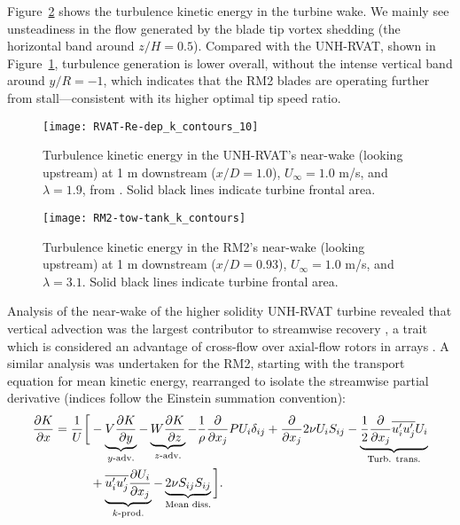 Figure~\ref{fig:kcont} shows the turbulence kinetic energy in the turbine wake. We
mainly see unsteadiness in the flow generated by the blade tip vortex shedding
(the horizontal band around $z/H=0.5$). Compared with the UNH-RVAT, shown in
Figure~\ref{fig:rvat-kcont}, turbulence generation is lower overall, without the
intense vertical band around $y/R=-1$, which indicates that the RM2 blades are
operating further from stall---consistent with its higher optimal tip speed
ratio.

\begin{figure}
    \texttt{[image: RVAT-Re-dep\_k\_contours\_10]}
    
    \caption{Turbulence kinetic energy in the UNH-RVAT's near-wake (looking
        upstream) at 1 m downstream ($x/D=1.0$), $U_\infty=1.0$ m/s, and
        $\lambda=1.9$, from \cite{Bachant2016-Energies}. Solid black lines indicate
        turbine frontal area.}
    
    \label{fig:rvat-kcont}
\end{figure}

\begin{figure}
    \texttt{[image: RM2-tow-tank\_k\_contours]}
    
    \caption{Turbulence kinetic energy in the RM2's near-wake (looking upstream)
        at 1 m downstream ($x/D=0.93$), $U_\infty=1.0$ m/s, and $\lambda=3.1$. Solid
        black lines indicate turbine frontal area.}
    
    \label{fig:kcont}
\end{figure}

Analysis of the near-wake of the higher solidity UNH-RVAT turbine revealed that
vertical advection was the largest contributor to streamwise recovery
\cite{Bachant2015-JoT}, a trait which is considered an advantage of cross-flow
over axial-flow rotors in arrays \cite{Kinzel2012}. A similar analysis was
undertaken for the RM2, starting with the transport equation for mean kinetic
energy, rearranged to isolate the streamwise partial derivative (indices follow
the Einstein summation convention):
\begin{equation}
\begin{split}
    \frac{\partial K}{\partial x}
    =
    \frac{1}{U}
    \bigg{[}
    & - \underbrace{V \frac{\partial K}{\partial y}}_{y\text{-adv.}}
    - \underbrace{W \frac{\partial K}{\partial z}}_{z\text{-adv.}}
    - \frac{1}{\rho}\frac{\partial}{\partial x_j} P U_i \delta_{ij}
    + \frac{\partial}{\partial x_j} 2 \nu U_i S_{ij}
    - \underbrace{
        \frac{1}{2}\frac{\partial}{\partial x_j} \overline{u_i' u_j'} U_i
    }_{\text{Turb. trans.}} \\
    & + 
    \underbrace{
        \overline{u_i' u_j'} \frac{\partial U_i}{\partial x_j}
    }_{k\text{-prod.}}
    - 
    \underbrace{
        2 \nu S_{ij}S_{ij}
    }_{\text{Mean diss.}}
    \bigg{]}.
\end{split}
\label{eq:K-full}
\end{equation}


